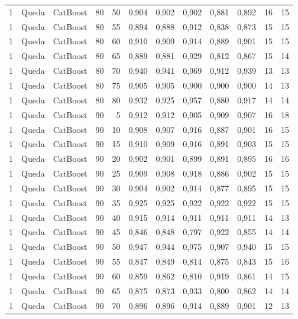 \begin{longtable}{@{}rllrrrrrrrrr@{}}
1 & Queda & CatBoost & 80 & 50 & 0,904 & 0,902 & 0,902 & 0,881 & 0,892 & 16 & 15 \\
1 & Queda & CatBoost & 80 & 55 & 0,894 & 0,888 & 0,912 & 0,838 & 0,873 & 15 & 15 \\
1 & Queda & CatBoost & 80 & 60 & 0,910 & 0,909 & 0,914 & 0,889 & 0,901 & 15 & 15 \\
1 & Queda & CatBoost & 80 & 65 & 0,889 & 0,881 & 0,929 & 0,812 & 0,867 & 15 & 14 \\
1 & Queda & CatBoost & 80 & 70 & 0,940 & 0,941 & 0,969 & 0,912 & 0,939 & 13 & 13 \\
1 & Queda & CatBoost & 80 & 75 & 0,905 & 0,905 & 0,900 & 0,900 & 0,900 & 14 & 13 \\
1 & Queda & CatBoost & 80 & 80 & 0,932 & 0,925 & 0,957 & 0,880 & 0,917 & 14 & 14 \\
1 & Queda & CatBoost & 90 & 5 & 0,912 & 0,912 & 0,905 & 0,909 & 0,907 & 16 & 18 \\
1 & Queda & CatBoost & 90 & 10 & 0,908 & 0,907 & 0,916 & 0,887 & 0,901 & 16 & 15 \\
1 & Queda & CatBoost & 90 & 15 & 0,910 & 0,909 & 0,916 & 0,891 & 0,903 & 15 & 15 \\
1 & Queda & CatBoost & 90 & 20 & 0,902 & 0,901 & 0,899 & 0,891 & 0,895 & 16 & 16 \\
1 & Queda & CatBoost & 90 & 25 & 0,909 & 0,908 & 0,918 & 0,886 & 0,902 & 15 & 15 \\
1 & Queda & CatBoost & 90 & 30 & 0,904 & 0,902 & 0,914 & 0,877 & 0,895 & 15 & 15 \\
1 & Queda & CatBoost & 90 & 35 & 0,925 & 0,925 & 0,922 & 0,922 & 0,922 & 15 & 15 \\
1 & Queda & CatBoost & 90 & 40 & 0,915 & 0,914 & 0,911 & 0,911 & 0,911 & 14 & 13 \\
1 & Queda & CatBoost & 90 & 45 & 0,846 & 0,848 & 0,797 & 0,922 & 0,855 & 14 & 14 \\
1 & Queda & CatBoost & 90 & 50 & 0,947 & 0,944 & 0,975 & 0,907 & 0,940 & 15 & 15 \\
1 & Queda & CatBoost & 90 & 55 & 0,847 & 0,849 & 0,814 & 0,875 & 0,843 & 15 & 16 \\
1 & Queda & CatBoost & 90 & 60 & 0,859 & 0,862 & 0,810 & 0,919 & 0,861 & 14 & 15 \\
1 & Queda & CatBoost & 90 & 65 & 0,875 & 0,873 & 0,933 & 0,800 & 0,862 & 14 & 14 \\
1 & Queda & CatBoost & 90 & 70 & 0,896 & 0,896 & 0,914 & 0,889 & 0,901 & 12 & 13 \\

\end{longtable}
